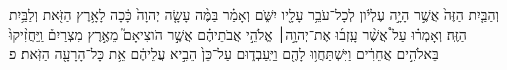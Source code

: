 \documentclass{openreader}
\begin{document}
וְהַבַּ֤יִת הַזֶּה֙ אֲשֶׁ֣ר הָיָ֣ה עֶלְיֹ֔ון לְכָל־עֹבֵ֥ר עָלָ֖יו יִשֹּׁ֑ם וְאָמַ֗ר בַּמֶּ֨ה עָשָׂ֤ה יְהוָה֙ כָּ֔כָה לָאָ֥רֶץ הַזֹּ֖את וְלַבַּ֥יִת הַזֶּֽה׃ 
וְאָמְר֗וּ עַל֩ אֲשֶׁ֨ר עָֽזְב֜וּ אֶת־יְהוָ֣ה׀ אֱלֹהֵ֣י אֲבֹתֵיהֶ֗ם אֲשֶׁ֣ר הֹוצִיאָם֮ מֵאֶ֣רֶץ מִצְרַיִם֒ וַֽיַּחֲזִ֨יקוּ֙ בֵּאלֹהִ֣ים אֲחֵרִ֔ים וַיִּשְׁתַּחֲו֥וּ לָהֶ֖ם וַיַּֽעַבְד֑וּם עַל־כֵּן֙ הֵבִ֣יא עֲלֵיהֶ֔ם אֵ֥ת כָּל־הָרָעָ֖ה הַזֹּֽאת׃ פ 
\end{document}
